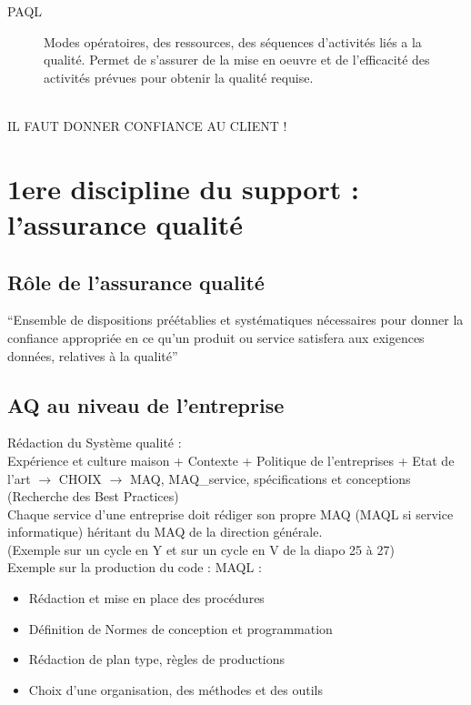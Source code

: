 \begin{description}
\begin{description}
\item[PAQL] Modes opératoires, des ressources, des séquences d’activités liés a la qualité. Permet de s’assurer de la mise en oeuvre et de l’efficacité des activités prévues pour obtenir la qualité requise.
\end{description}
\hfill\\
IL FAUT DONNER CONFIANCE AU CLIENT !

\section{1ere discipline du support : l'assurance qualité}

	\subsection{Rôle de l’assurance qualité}

“Ensemble de dispositions préétablies et systématiques nécessaires pour donner la confiance appropriée en ce qu’un produit ou service satisfera aux exigences données, relatives à la qualité”


	\subsection{AQ au niveau de l’entreprise}

Rédaction du Système qualité :\\
	Expérience et culture maison + Contexte + Politique de l’entreprises + Etat de l’art
		$\rightarrow$ CHOIX $\rightarrow$ MAQ, MAQ\_service, spécifications et conceptions\\
			(Recherche des Best Practices)\\

Chaque service d’une entreprise doit rédiger son propre MAQ (MAQL si service informatique) héritant du MAQ de la direction générale.\\

(Exemple sur un cycle en Y et sur un cycle en V de la diapo 25 à 27)\\

Exemple sur la production du code : MAQL :
\begin{itemize}
\item Rédaction et mise en place des procédures
\item Définition de Normes de conception et programmation
\item Rédaction de plan type, règles de productions
\item Choix d’une organisation, des méthodes et des outils
\end{itemize}


\end{description}
